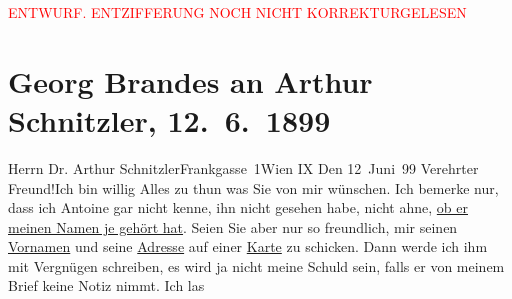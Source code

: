 
\begin{center}
            \textcolor{red}{ENTWURF. ENTZIFFERUNG NOCH NICHT KORREKTURGELESEN}
                      \end{center}
            
               \section[Georg Brandes an Arthur Schnitzler, 12. 6. 1899]{ Georg Brandes an Arthur Schnitzler, 12. 6. 1899}\nopagebreak{}\rehead{ }\begin{ledgroupsized}[t]{13cm}\normalsize\beginnumbering{} \toendnotes[C]{\smallbreak\pagebreak[2]} 
\toendnotes[C]{\smallbreak}\pstart{}{\pb}Herrn Dr. Arthur
                        Schnitzler\pend{}\pstart{}Frankgasse 1\pend{}\pstart{}Wien IX\pend{}{\bigskip}\pstart
           \raggedleft{}{\pb}Den
                            12 Juni 99\pend
           \pstart
           Verehrter Freund!\hspace*{2.5em}Ich bin willig Alles zu thun
                    was Sie von mir wünschen. Ich bemerke nur, dass ich Antoine gar nicht kenne, ihn nicht gesehen habe, nicht ahne, \uline{ob er meinen Namen je gehört hat}. Seien Sie aber
                    nur so freundlich, mir seinen \uline{Vornamen} und seine
                        \uline{Adresse} auf einer \uline{Karte} zu schicken. Dann werde ich ihm mit Vergnügen schreiben, es wird
                    ja nicht meine Schuld sein, falls er von meinem Brief keine Notiz nimmt. Ich las

\end{ledgroupsized}
